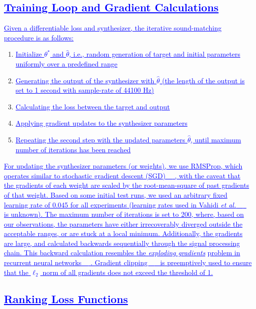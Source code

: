 \documentclass[lettersize,journal]{IEEEtran}
\renewcommand{\DIFadd}[1]{\textcolor{blue}{\uline{#1}}}
\providecommand{\DIFadd}[1]{{\protect\color{blue}\uwave{#1}}} %
\begin{document}
\subsection{\DIFadd{Training Loop and Gradient Calculations}}
\DIFadd{Given a differentiable loss and synthesizer, the iterative sound-matching procedure is as follows:
 }\begin{enumerate}
    \item \DIFadd{Initialize $\theta^*$ and $\hat{\theta}$, i.e., random generation of target and initial parameters uniformly over a predefined range
    }\item \DIFadd{Generating the output of the synthesizer with $\hat{\theta}$ (the length of the output is set to 1 second with sample-rate of 44100 Hz) 
    }\item \DIFadd{Calculating the loss between the target and output
    }\item \DIFadd{Applying gradient updates to the synthesizer parameters
    }\item \DIFadd{Repeating the second step with the updated parameters $\hat{\theta}$, until maximum number of iterations has been reached
 }\end{enumerate}

 \DIFadd{For updating the synthesizer parameters (or weights), we use RMSProp, which operates similar to stochastic gradient descent (SGD)~\mbox{%
\cite{goodfellow2016deep}}\hskip0pt%
, with the caveat that the gradients of each weight are scaled by the root-mean-square of past gradients of that weight. Based on some initial test runs, we used an arbitrary fixed learning rate of 0.045 for all experiments (learning rates used in Vahidi }\textit{\DIFadd{et al.}}\DIFadd{~\mbox{%
\cite{vahidi2023mesostructures} }\hskip0pt%
is unknown). The maximum number of iterations is set to 200, where, based on our observations, the parameters have either irrecoverably diverged outside the acceptable ranges, or are stuck at a local minimum. Additionally, the gradients are large, and calculated backwards sequentially through the signal processing chain. This backward calculation resembles the }\textit{\DIFadd{exploding gradients}} \DIFadd{problem in recurrent neural networks~\mbox{%
\cite{gers2000learning}}\hskip0pt%
. Gradient clipping~\mbox{%
\cite{goodfellow2016deep} }\hskip0pt%
is preemptively used to ensure that the  $\ell_2$ norm of all gradients does not exceed the threshold of 1. 
}\subsection{\DIFadd{Ranking Loss Functions}}
\end{document}
